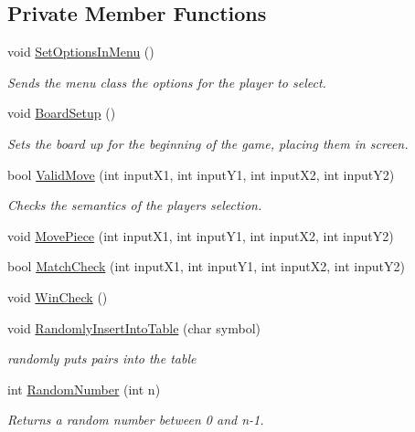 \subsection*{Private Member Functions}
\begin{DoxyCompactItemize}
\item 
void \hyperlink{classMemoryMatch_a62548d6cf028d372c08cc01a0693edb2}{Set\-Options\-In\-Menu} ()
\begin{DoxyCompactList}\small\item\em Sends the menu class the options for the player to select. \end{DoxyCompactList}\item 
void \hyperlink{classMemoryMatch_a1e3b9172bdd0fb69f0360bb28acee65c}{Board\-Setup} ()
\begin{DoxyCompactList}\small\item\em Sets the board up for the beginning of the game, placing them in screen. \end{DoxyCompactList}\item 
bool \hyperlink{classMemoryMatch_ae5f190c71bc1a63ec95eab6fd8a3c2c7}{Valid\-Move} (int input\-X1, int input\-Y1, int input\-X2, int input\-Y2)
\begin{DoxyCompactList}\small\item\em Checks the semantics of the players selection. \end{DoxyCompactList}\item 
void \hyperlink{classMemoryMatch_a68e81f3e7ed13385f430da0bc938d7e9}{Move\-Piece} (int input\-X1, int input\-Y1, int input\-X2, int input\-Y2)
\item 
bool \hyperlink{classMemoryMatch_a7a83e4a378bb74a729d495d9a8896248}{Match\-Check} (int input\-X1, int input\-Y1, int input\-X2, int input\-Y2)
\item 
void \hyperlink{classMemoryMatch_a1c958b2c366188c2c603c562b3f2f878}{Win\-Check} ()
\item 
void \hyperlink{classMemoryMatch_a61158d799b281be3607860233899b405}{Randomly\-Insert\-Into\-Table} (char symbol)
\begin{DoxyCompactList}\small\item\em randomly puts pairs into the table \end{DoxyCompactList}\item 
int \hyperlink{classMemoryMatch_a0543038015f3bbd9db9e9a235cf12579}{Random\-Number} (int n)
\begin{DoxyCompactList}\small\item\em Returns a random number between 0 and n-\/1. \end{DoxyCompactList}\item 

\end{DoxyCompactItemize}
